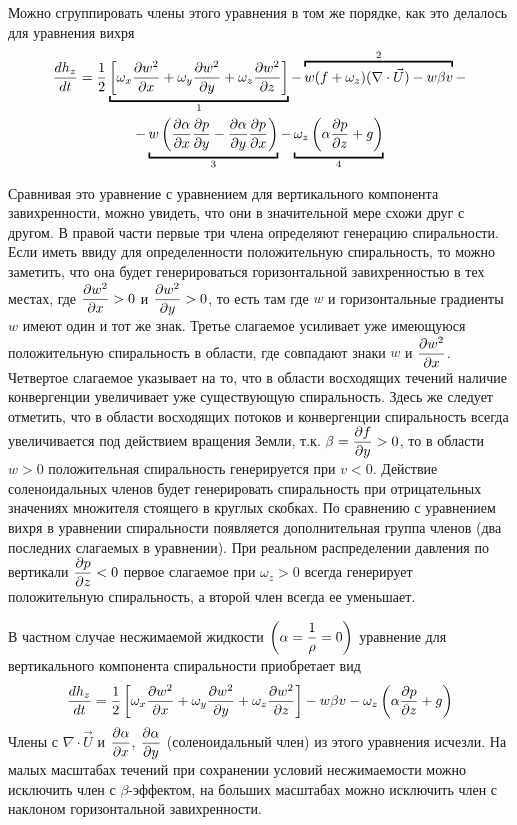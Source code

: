 Можно сгруппировать члены этого уравнения в том же порядке, как это делалось для уравнения вихря
\begin{multline}
    \td{h_z}{t} = \frac{1}{2} \ub{ \qb{ \omega_x\pd{w^2}{x} + \omega_y\pd{w^2}{y} + \omega_z\pd{w^2}{z} } }_{1} - 
    \ob{\tikzmark{ch10-4}w(f+\tikzmark{ch10-5}\omega_z)(\nabla\cdot\vec{U}) - w\beta v }^{2} - \\
  - \ub{ w \rb{ \pd{\alpha}{x}\pd{p}{y} - \pd{\alpha}{y}\pd{p}{x} } }_{3} - 
    \ub{ \omega_z \rb{ \alpha\pd{p}{z}+g } }_{4} \label{eq:ch10-curl1}
\end{multline}
Сравнивая это уравнение с уравнением для вертикального компонента завихренности, можно увидеть, что они в значительной мере схожи друг с другом. В правой части первые три члена определяют генерацию спиральности. Если иметь ввиду для определенности положительную спиральность, то можно заметить, что она будет генерироваться горизонтальной завихренностью в тех местах, где $\displaystyle\frac{\partial w^2}{\partial x}>0$ и $\displaystyle\frac{\partial w^2}{\partial y}>0$, то есть там где $w$ и горизонтальные градиенты $w$ имеют один и тот же знак. Третье слагаемое усиливает уже имеющуюся положительную спиральность в области, где совпадают знаки $w$ и $\displaystyle\frac{\partial w^2}{\partial x}$. Четвертое слагаемое указывает на то, что в области восходящих течений наличие конвергенции увеличивает уже существующую спиральность. Здесь же следует отметить, что в области восходящих потоков и конвергенции спиральность всегда увеличивается под действием вращения Земли, т.к. $\beta=\displaystyle\frac{\partial f}{\partial y}>0$, то в области $w>0$ положительная спиральность генерируется при $v<0$. Действие соленоидальных членов будет генерировать спиральность при отрицательных значениях множителя стоящего в круглых скобках. По сравнению с уравнением вихря в уравнении спиральности появляется дополнительная группа членов (два последних слагаемых в уравнении). При реальном распределении давления по вертикали $\displaystyle\frac{\partial p}{\partial z}<0$ первое слагаемое при $\omega_z > 0$ всегда генерирует положительную спиральность, а второй член всегда ее уменьшает.

В частном случае несжимаемой жидкости $ \displaystyle \left(  \alpha=\frac{1}{\rho}=0  \right)$ уравнение для вертикального компонента спиральности приобретает вид
\begin{equation}
    \label{eq:ch10-curl2}
    \displaystyle\frac{d h_z}{d t} = \frac{1}{2} \displaystyle \left[  \omega_x\displaystyle\frac{\partial w^2}{\partial x} +\omega_y\displaystyle\frac{\partial w^2}{\partial y} +\omega_z\displaystyle\frac{\partial w^2}{\partial z}  \right] - w\beta v - \omega_z \displaystyle \left(  \alpha\displaystyle\frac{\partial p}{\partial z} + g  \right)
\end{equation}
Члены с $\nabla\cdot\vec{U}$ и $\displaystyle\frac{\partial \alpha}{\partial x}$, $\displaystyle\frac{\partial \alpha}{\partial y}$ (соленоидальный член) из этого уравнения исчезли. На малых масштабах течений при сохранении условий несжимаемости можно исключить член с $\beta$-эффектом, на больших масштабах можно исключить член с наклоном горизонтальной завихренности.

